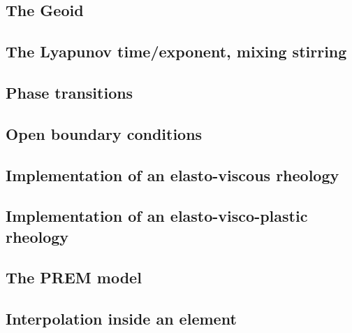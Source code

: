 \documentclass[a4paper]{article}
\numberwithin{equation}{section}
\begin{document}
\subsection{The Geoid} \label{ss:geoid}  %
\newpage %
\subsection{The Lyapunov time/exponent, mixing stirring}\label{ss:lyapunov} %
\newpage %
\subsection{Phase transitions}\label{ss:phasetransitions} %
\newpage %
\subsection{Open boundary conditions}\label{ss:openbc} %
\newpage %
\subsection{Implementation of an elasto-viscous rheology} \label{ss:evrheo}  %
\newpage %
\subsection{Implementation of an elasto-visco-plastic rheology}\label{ss:evprheo} %
\newpage %
\subsection{The PREM model} \label{ss:prem}  %
\newpage %
\subsection{Interpolation inside an element} \label{ss:bern}  %
\newpage %
\end{document}
